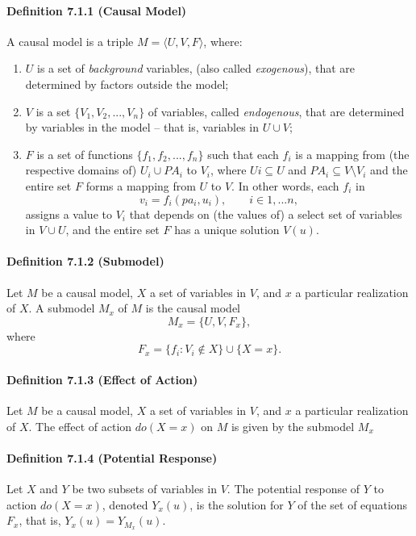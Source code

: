 \paragraph{Definition 7.1.1 (Causal Model)}
A causal model is a triple
$M = \langle U, V, F\rangle$,
where:
\begin{enumerate}[label=(\roman*)]
    \item $U$ is a set of \emph{background} variables, (also called \emph{exogenous}), that are determined by factors outside the model;
    \item $V$ is a set $\{V_1 , V_2 ,..., V_n\}$ of variables, called \emph{endogenous}, that are determined by variables in the model -- that is, variables in $U\cup V$;
    \item $F$ is a set of functions $\{f_1 , f_2 ,..., f_n\}$ such that each $f_i$ is a mapping from (the respective domains of) $U_i \cup PA_i$ to $V_i$, where $U i \subseteq U$ and $PA_i \subseteq V \setminus V_i$ and the entire set $F$ forms a mapping from $U$ to $V$. In other words, each $f_i$ in $$v_i = f_i (pa_i , u_i ),\qquad  i\in 1, ... n,$$ assigns a value to $V_i$ that depends on (the values of) a select set of variables in $V \cup U$, and the entire set $F$ has a unique solution $V(u)$.
\end{enumerate}

\paragraph{Definition 7.1.2 (Submodel)}
Let $M$ be a causal model, $X$ a set of variables in $V$, and $x$ a particular realization of $X$. A submodel $M_x$ of $M$ is the causal model $$M_x =\{U, V, F_x\},$$ where $$F_x = \{ f_i : V_i \notin X\}\cup\{ X = x\}.$$

\paragraph{Definition 7.1.3 (Effect of Action)}
Let $M$ be a causal model, $X$ a set of variables in $V$, and $x$ a particular realization of $X$. The effect of action $do(X=x)$ on $M$ is given by the submodel $M_x$

\paragraph{Definition 7.1.4 (Potential Response)}
Let $X$ and $Y$ be two subsets of variables in $V$. The potential response of $Y$ to action $do(X = x)$, denoted $Y_x(u)$, is the solution for $Y$ of the set of equations $F_x$, that is, $Y_x(u) = Y_{M_x}(u)$.

